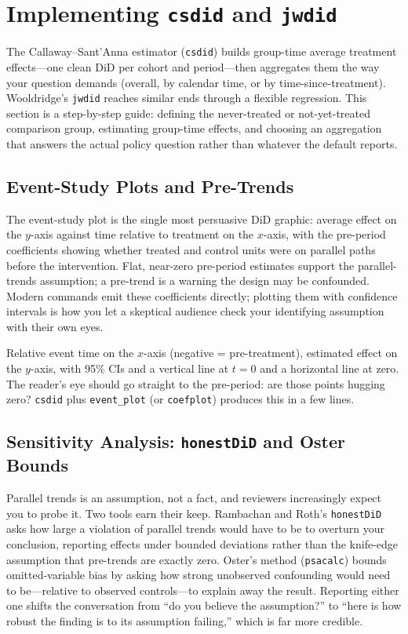 \documentclass[
    a4paper,
    fontsize=10pt,
    twoside=true,
    numbers=noenddot,
]{kaobook}
\newenvironment{vizcallout}[1][Visualization to build]{%
    \begin{vizbox}[frametitle={#1}]%
}{%
    \end{vizbox}%
}
\begin{document}
\section{Implementing \texttt{csdid} and \texttt{jwdid}}
The Callaway--Sant'Anna estimator (\texttt{csdid}) builds group-time average treatment effects---one clean DiD per cohort and period---then aggregates them the way your question demands (overall, by calendar time, or by time-since-treatment). Wooldridge's \texttt{jwdid} reaches similar ends through a flexible regression. This section is a step-by-step guide: defining the never-treated or not-yet-treated comparison group, estimating group-time effects, and choosing an aggregation that answers the actual policy question rather than whatever the default reports.

\subsection{Event-Study Plots and Pre-Trends}
The event-study plot is the single most persuasive DiD graphic: average effect on the $y$-axis against time relative to treatment on the $x$-axis, with the pre-period coefficients showing whether treated and control units were on parallel paths before the intervention. Flat, near-zero pre-period estimates support the parallel-trends assumption; a pre-trend is a warning the design may be confounded. Modern commands emit these coefficients directly; plotting them with confidence intervals is how you let a skeptical audience check your identifying assumption with their own eyes.

\begin{vizcallout}[Visualization to build: the event-study plot]
Relative event time on the $x$-axis (negative = pre-treatment), estimated effect on the $y$-axis, with 95\% CIs and a vertical line at $t=0$ and a horizontal line at zero. The reader's eye should go straight to the pre-period: are those points hugging zero? \texttt{csdid} plus \texttt{event\_plot} (or \texttt{coefplot}) produces this in a few lines.
\end{vizcallout}

\subsection{Sensitivity Analysis: \texttt{honestDiD} and Oster Bounds}
Parallel trends is an assumption, not a fact, and reviewers increasingly expect you to probe it. Two tools earn their keep. Rambachan and Roth's \texttt{honestDiD} asks how large a violation of parallel trends would have to be to overturn your conclusion, reporting effects under bounded deviations rather than the knife-edge assumption that pre-trends are exactly zero. Oster's method (\texttt{psacalc}) bounds omitted-variable bias by asking how strong unobserved confounding would need to be---relative to observed controls---to explain away the result. Reporting either one shifts the conversation from \enquote{do you believe the assumption?} to \enquote{here is how robust the finding is to its assumption failing,} which is far more credible.
\end{document}

